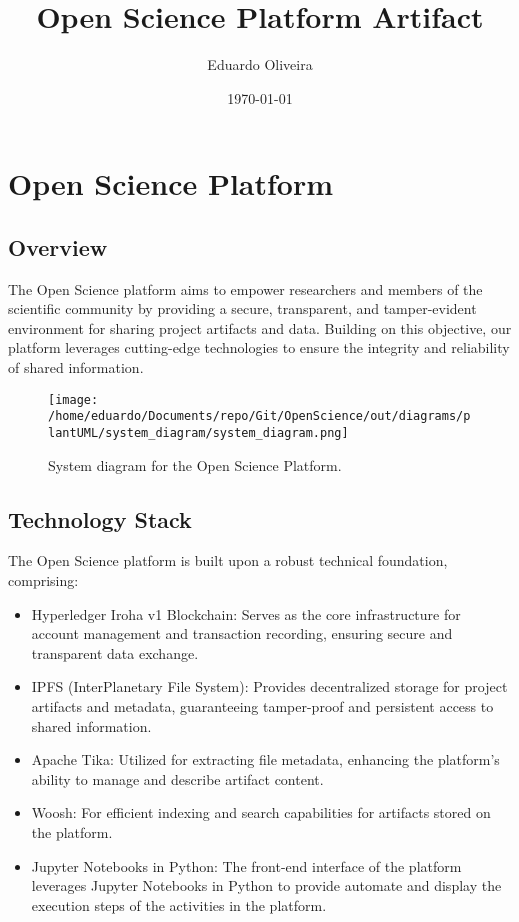 \documentclass{article}
\title{Open Science Platform Artifact}
\author{Eduardo Oliveira}
\date{\today}
\begin{document}
\maketitle

\section{Open Science Platform}

\subsection{Overview}

The Open Science platform aims to empower researchers and members of the scientific community by providing a secure, transparent, and tamper-evident environment for sharing project artifacts and data. Building on this objective, our platform leverages cutting-edge technologies to ensure the integrity and reliability of shared information.


\vspace{1cm}
    
\begin{figure}[H]
    \centering
    \texttt{[image: /home/eduardo/Documents/repo/Git/OpenScience/out/diagrams/plantUML/system\_diagram/system\_diagram.png]}  %
    \caption{System diagram for the Open Science Platform.}
    \label{fig:er-diagram}
\end{figure}


\subsection{Technology Stack}

The Open Science platform is built upon a robust technical foundation, comprising:

\begin{itemize}
  \item Hyperledger Iroha v1 Blockchain: Serves as the core infrastructure for account management and transaction recording, ensuring secure and transparent data exchange.
  \item IPFS (InterPlanetary File System): Provides decentralized storage for project artifacts and metadata, guaranteeing tamper-proof and persistent access to shared information.
  \item Apache Tika: Utilized for extracting file metadata, enhancing the platform's ability to manage and describe artifact content.
  \item Woosh: For efficient indexing and search capabilities for artifacts stored on the platform.
  \item Jupyter Notebooks in Python: The front-end interface of the platform leverages Jupyter Notebooks in Python to provide automate and display the execution steps of the activities in the platform.
\end{itemize}
\end{document}
